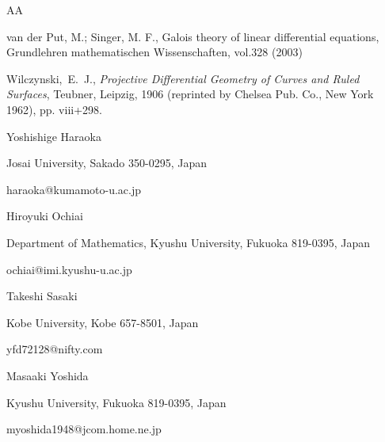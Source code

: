 \documentclass[a4paper,12pt]{article}
\theoremstyle{definition}
\theoremstyle{remark}
\numberwithin{equation}{section} %
\begin{document}
\begin{thebibliography}{AA}

 van der Put, M.; Singer, M. F., Galois theory of linear differential equations, Grundlehren mathematischen Wissenschaften, vol.328 (2003)

 Wilczynski,~E.~J.,
    {\sl Projective Differential Geometry of Curves 
      and Ruled Surfaces}, Teubner, Leipzig, 1906 (reprinted
by Chelsea Pub. Co., New York 1962), pp. viii+298.


\end{thebibliography}

\bigskip

\noindent 
Yoshishige Haraoka

Josai University, Sakado 350-0295, Japan

haraoka@kumamoto-u.ac.jp


\medskip \noindent
Hiroyuki Ochiai

Department of Mathematics, Kyushu University, Fukuoka 819-0395, Japan 

ochiai@imi.kyushu-u.ac.jp

\medskip \noindent 
Takeshi Sasaki

Kobe University, Kobe 657-8501, Japan 

yfd72128@nifty.com

\medskip \noindent 
Masaaki Yoshida 

Kyushu University, Fukuoka 819-0395, Japan 

myoshida1948@jcom.home.ne.jp
\end{document}
